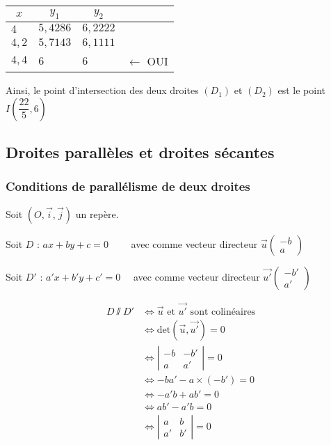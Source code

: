 \begin{tabular}{l|l|l|l}
\multicolumn{1}{c|}{$x$} & \multicolumn{1}{c|}{$y_{1}$}  & \multicolumn{1}{c|}{$y_{2}$} & \\
\hline
$4$ & $5,4286$ & $6,2222$ & \\
$4,2$ & $5,7143$ & $6,1111$ & \\
$4,4$ & $6$ & $6$ & $\longleftarrow$ OUI \\
\end{tabular}

Ainsi, le point d'intersection des deux droites $(D_{1})$ et $ (D_{2}) $ est le point $ I\left(\dfrac{22}{5}, 6\right) $

\newpage
\subsection{Droites parallèles et droites sécantes}
\subsubsection{Conditions de parallélisme de deux droites}

Soit $(O,\vec{i},\vec{j})$ un repère.

Soit $D$ : $ax +by + c = 0 \qquad $ avec comme vecteur directeur $ \vec{u}
\left(\begin{array}{c}
-b\\
a
\end{array}\right)$


Soit $D'$ : $a'x +b'y + c' = 0 \quad $ avec comme vecteur directeur $ \overrightarrow{u'}
\left(\begin{array}{c}
-b'\\
a'
\end{array}\right)$



\begin{align*}
     D \sslash D' &\Longleftrightarrow   \overrightarrow{u} \text { et }\overrightarrow{u'}               \text{ sont colinéaires} \\ 
     &\Longleftrightarrow \text{det}(\overrightarrow{u},\overrightarrow{u'})=0 \\
     & \Longleftrightarrow \left| \begin{array}{cc}
                                    -b & -b'\\
                                     a & a'
                                  \end{array} \right|=0 \\
    & \Longleftrightarrow -ba'-a \times (-b')=0\\
    & \Longleftrightarrow  -a'b+ab'=0\\
    & \Longleftrightarrow ab' - a'b=0\\
    & \Longleftrightarrow \left| \begin{array}{cc}
                                    a & b\\
                                   a' & b'
                                 \end{array} \right|=0 \\
\end{align*}


